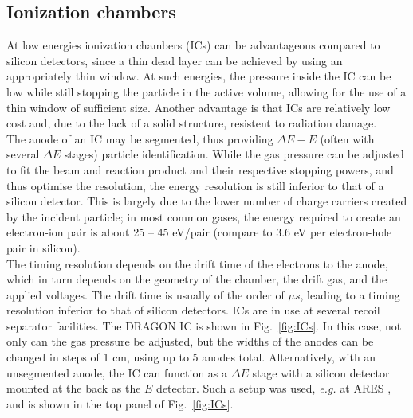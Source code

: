 \subsection{Ionization chambers}
At low energies ionization chambers (ICs) can be advantageous compared to silicon detectors, since a thin dead layer can be achieved by using an appropriately thin window. At such energies, the pressure inside the IC can be low while still stopping the particle in the active volume, allowing for the use of a thin window of sufficient size. Another advantage is that ICs are relatively low cost and, due to the lack of a solid structure, resistent to radiation damage.\\
The anode of an IC may be segmented, thus providing $\Delta{}E-E$ (often with several $\Delta{}E$ stages) particle identification. While the gas pressure can be adjusted to fit the beam and reaction product and their respective stopping powers, and thus optimise the resolution, the energy resolution is still inferior to that of a silicon detector. This is largely due to the lower number of charge carriers created by the incident particle; in most common gases, the energy required to create an electron-ion pair is about 25 -- 45 eV/pair (compare to 3.6 eV per electron-hole pair in silicon).\\
The timing resolution depends on the drift time of the electrons to the anode, which in turn depends on the geometry of the chamber, the drift gas, and the applied voltages. The drift time is usually of the order of $\unit{\mu{}s}$, leading to a timing resolution inferior to that of silicon detectors. 
ICs are in use at several recoil separator facilities. The DRAGON IC is shown in Fig.\ \ref{fig:ICs}. In this case, not only can the gas pressure be adjusted, but the widths of the anodes can be changed in steps of 1 cm, using up to 5 anodes total.
Alternatively, with an unsegmented anode, the IC can function as a $\Delta{}E$ stage with a silicon detector mounted at the back as the $E$ detector. Such a setup was used, {\it e.g.} at ARES \cite{coud03}, and is shown in the top panel of Fig.\ \ref{fig:ICs}.
